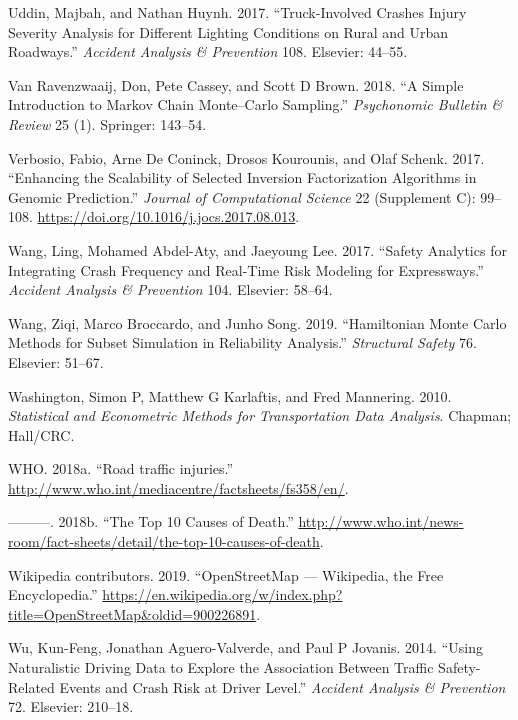 \documentclass[12pt]{book}
\numberwithin{equation}{chapter}
\begin{document}
\leavevmode\hypertarget{ref-uddin2017truck}{}%
Uddin, Majbah, and Nathan Huynh. 2017. ``Truck-Involved Crashes Injury Severity Analysis for Different Lighting Conditions on Rural and Urban Roadways.'' \emph{Accident Analysis \& Prevention} 108. Elsevier: 44--55.

\leavevmode\hypertarget{ref-van2018simple}{}%
Van Ravenzwaaij, Don, Pete Cassey, and Scott D Brown. 2018. ``A Simple Introduction to Markov Chain Monte--Carlo Sampling.'' \emph{Psychonomic Bulletin \& Review} 25 (1). Springer: 143--54.

\leavevmode\hypertarget{ref-Verbosio2017}{}%
Verbosio, Fabio, Arne De Coninck, Drosos Kourounis, and Olaf Schenk. 2017. ``Enhancing the Scalability of Selected Inversion Factorization Algorithms in Genomic Prediction.'' \emph{Journal of Computational Science} 22 (Supplement C): 99--108. \url{https://doi.org/10.1016/j.jocs.2017.08.013}.

\leavevmode\hypertarget{ref-wang2017safety}{}%
Wang, Ling, Mohamed Abdel-Aty, and Jaeyoung Lee. 2017. ``Safety Analytics for Integrating Crash Frequency and Real-Time Risk Modeling for Expressways.'' \emph{Accident Analysis \& Prevention} 104. Elsevier: 58--64.

\leavevmode\hypertarget{ref-wang2019hamiltonian}{}%
Wang, Ziqi, Marco Broccardo, and Junho Song. 2019. ``Hamiltonian Monte Carlo Methods for Subset Simulation in Reliability Analysis.'' \emph{Structural Safety} 76. Elsevier: 51--67.

\leavevmode\hypertarget{ref-washington2010statistical}{}%
Washington, Simon P, Matthew G Karlaftis, and Fred Mannering. 2010. \emph{Statistical and Econometric Methods for Transportation Data Analysis}. Chapman; Hall/CRC.

\leavevmode\hypertarget{ref-who2018b}{}%
WHO. 2018a. ``Road traffic injuries.'' \url{http://www.who.int/mediacentre/factsheets/fs358/en/}.

\leavevmode\hypertarget{ref-who2018}{}%
---------. 2018b. ``The Top 10 Causes of Death.'' \url{http://www.who.int/news-room/fact-sheets/detail/the-top-10-causes-of-death}.

\leavevmode\hypertarget{ref-wikiOSM}{}%
Wikipedia contributors. 2019. ``OpenStreetMap --- Wikipedia, the Free Encyclopedia.'' \url{https://en.wikipedia.org/w/index.php?title=OpenStreetMap\&oldid=900226891}.

\leavevmode\hypertarget{ref-wu2014using}{}%
Wu, Kun-Feng, Jonathan Aguero-Valverde, and Paul P Jovanis. 2014. ``Using Naturalistic Driving Data to Explore the Association Between Traffic Safety-Related Events and Crash Risk at Driver Level.'' \emph{Accident Analysis \& Prevention} 72. Elsevier: 210--18.
\end{document}
